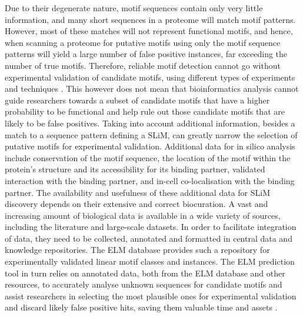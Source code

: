 Due to their degenerate nature, motif sequences contain only very little 
information, and many short sequences in a proteome will match motif patterns. 
However, most of these matches will not represent functional motifs, and hence, 
when scanning a proteome for putative motifs using only the motif sequence 
patterns will yield a large number of false positive instances, far exceeding 
the number of true motifs. Therefore, reliable motif detection cannot go without 
experimental validation of candidate motifs, using different types of 
experiments and techniques \cite{26581338}. This however does not mean that 
bioinformatics analysis cannot guide researchers towards a subset of candidate 
motifs that have a higher probability to be functional and help rule out those 
candidate motifs that are likely to be false positives. Taking into account 
additional information, besides a match to a sequence pattern defining a SLiM, 
can greatly narrow the selection of putative motifs for experimental validation. 
Additional data for in silico analysis include conservation of the motif 
sequence, the location of the motif within the protein’s structure and its 
accessibility for its binding partner, validated interaction with the binding 
partner, and in-cell co-localisation with the binding partner. The availability 
and usefulness of these additional data for SLiM discovery depends on their 
extensive and correct biocuration. A vast and increasing amount of biological 
data is available in a wide variety of sources, including the literature and 
large-scale datasets. In order to facilitate integration of data, they need to 
be collected, annotated and formatted in central data and knowledge 
repositories. The ELM database provides such a repository for experimentally 
validated linear motif classes and instances. The ELM prediction tool in turn 
relies on annotated data, both from the ELM database and other resources, to 
accurately analyse unknown sequences for candidate motifs and assist researchers 
in selecting the most plausible ones for experimental validation and discard 
likely false positive hits, saving them valuable time and assets 
\cite{22110040}.


